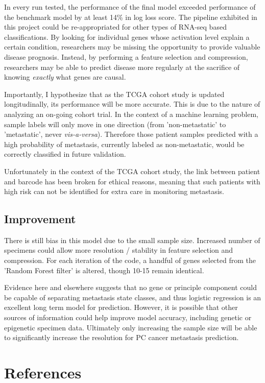 \documentclass[final]{article}
\begin{document}
In every run tested, the performance of the final model exceeded performance of
the benchmark model by at least 14\% in log loss score.  The pipeline exhibited
in this project could be re-appropriated for other types of RNA-seq based
classifications.  By looking for individual genes whose activation level explain
a certain condition, researchers may be missing the opportunity to provide
valuable disease prognosis.  Instead, by performing a feature selection and
compression, researchers may be able to predict disease more regularly at the
sacrifice of knowing \textit{exactly} what genes are causal.

Importantly, I hypothesize that as the TCGA cohort study is updated
longitudinally, its performance will be more accurate.  This is due to the
nature  of analyzing an on-going cohort trial.  In the context of a machine
learning problem,  sample labels will only move in one direction (from
'non-metastatic' to 'metastatic', never \textit{vis-a-versa}).  Therefore those patient
samples predicted with a high  probability of metastasis, currently labeled as
non-metastatic, would be correctly classified in future validation.

Unfortunately in the context of the TCGA cohort study, the link between patient
and barcode has been broken for ethical reasons, meaning that such patients with
high risk  can not be identified for extra care in monitoring metastasis.


\subsection{Improvement}

There is still bias in this model due to the small sample size.  Increased
number of specimens could allow more resolution / stability in feature selection
and  compression.  For each iteration of the code, a handful of genes selected
from the 'Random Forest filter' is altered, though 10-15 remain identical.

Evidence here and elsewhere suggests that no gene or principle component could
be capable of separating  metastasis state classes, and thus logistic regression
is an excellent long term  model for prediction.  However, it is possible that
other sources of information  could help improve model accuracy, including
genetic or epigenetic specimen data.  Ultimately only increasing the sample size
will be able to significantly increase the resolution for PC cancer metastasis
prediction.

\section{References}
\end{document}
